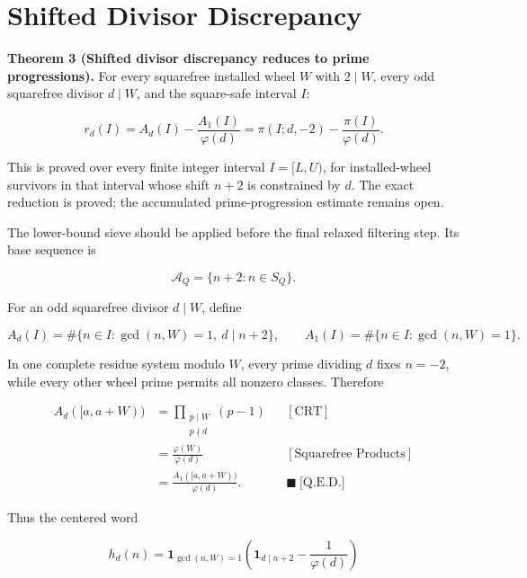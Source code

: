 \section{Shifted Divisor Discrepancy}

\textbf{Theorem 3 (Shifted divisor discrepancy reduces to prime progressions).}
For every squarefree installed wheel $W$ with $2\mid W$, every odd squarefree
divisor $d\mid W$, and the square-safe interval $I$:

\begin{equation*}
r_d(I)=A_d(I)-\frac{A_1(I)}{\varphi(d)}
=\pi(I;d,-2)-\frac{\pi(I)}{\varphi(d)}.
\end{equation*}

This is proved over every finite integer interval $I=[L,U)$, for
installed-wheel survivors in that interval whose shift $n+2$ is constrained
by $d$. The exact reduction is proved; the accumulated prime-progression
estimate remains open.

The lower-bound sieve should be applied before the final relaxed filtering
step. Its base sequence is

\begin{equation*}
\mathcal A_Q=\{n+2:n\in S_Q\}.
\end{equation*}

For an odd squarefree divisor $d\mid W$, define

\begin{equation*}
A_d(I)
=
\#\{n\in I:\gcd(n,W)=1,\ d\mid n+2\},
\qquad
A_1(I)=\#\{n\in I:\gcd(n,W)=1\}.
\end{equation*}

In one complete residue system modulo $W$, every prime dividing $d$ fixes
$n=-2$, while every other wheel prime permits all nonzero classes. Therefore

\begin{equation*}
\begin{aligned}
A_d([a,a+W))
&=\prod_{\substack{p\mid W\\p\nmid d}}(p-1)
&&[\text{CRT}]\\
&=\frac{\varphi(W)}{\varphi(d)}
&&[\text{Squarefree Products}]\\
&=\frac{A_1([a,a+W))}{\varphi(d)}.
&&\blacksquare\ \text{[Q.E.D.]}
\end{aligned}
\end{equation*}

Thus the centered word

\begin{equation*}
h_d(n)
=
\mathbf1_{\gcd(n,W)=1}
\left(\mathbf1_{d\mid n+2}-\frac1{\varphi(d)}\right)
\end{equation*}

